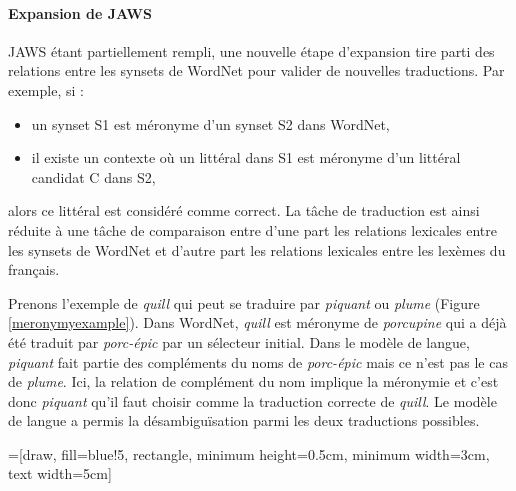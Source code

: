 \paragraph{Expansion de JAWS} JAWS étant partiellement rempli, une nouvelle étape d'expansion tire parti des relations entre les synsets de WordNet pour valider de nouvelles traductions. Par exemple, si :

\begin{itemize}
    \item un synset S1 est méronyme d'un synset S2 dans WordNet,
    \item il existe un contexte où un littéral dans S1 est méronyme d'un littéral candidat C dans S2,
\end{itemize}
alors ce littéral est considéré comme correct. La tâche de traduction est ainsi réduite à une tâche de comparaison entre d'une part les relations lexicales entre les synsets de WordNet et d'autre part les relations lexicales entre les lexèmes du français.

Prenons l'exemple de \textit{quill} qui peut se traduire par \textit{piquant} ou \textit{plume} (Figure \ref{meronymyexample}). Dans WordNet, \textit{quill} est méronyme de \textit{porcupine} qui a déjà été traduit par \textit{porc-épic} par un sélecteur initial. Dans le modèle de langue, \textit{piquant} fait partie des compléments du noms de \textit{porc-épic} mais ce n'est pas le cas de \textit{plume}. Ici, la relation de complément du nom implique la méronymie et c'est donc \textit{piquant} qu'il faut choisir comme la traduction correcte de \textit{quill}. Le modèle de langue a permis la désambiguïsation parmi les deux traductions possibles.

=[draw, fill=blue!5, rectangle, minimum height=0.5cm, minimum width=3cm, text width=5cm]


